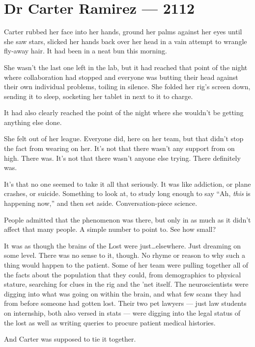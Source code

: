 \chapter*{Dr Carter Ramirez — 2112}

Carter rubbed her face into her hands, ground her palms against her eyes until she saw stars, slicked her hands back over her head in a vain attempt to wrangle fly-away hair. It had been in a neat bun this morning.

She wasn't the last one left in the lab, but it had reached that point of the night where collaboration had stopped and everyone was butting their head against their own individual problems, toiling in silence. She folded her rig's screen down, sending it to sleep, socketing her tablet in next to it to charge.

It had also clearly reached the point of the night where she wouldn't be getting anything else done.

She felt out of her league. Everyone did, here on her team, but that didn't stop the fact from wearing on her. It's not that there wasn't any support from on high. There was. It's not that there wasn't anyone else trying. There definitely was.

It's that no one seemed to take it all that seriously. It was like addiction, or plane crashes, or suicide. Something to look at, to study long enough to say ``Ah, \emph{this} is happening now,'' and then set aside. Conversation-piece science.

People admitted that the phenomenon was there, but only in as much as it didn't affect that many people. A simple number to point to. See how small?

It was as though the brains of the Lost were just\ldots{}elsewhere. Just dreaming on some level. There was no sense to it, though. No rhyme or reason to why such a thing would happen to the patient. Some of her team were pulling together all of the facts about the population that they could, from demographics to physical stature, searching for clues in the rig and the 'net itself. The neuroscientists were digging into what was going on within the brain, and what few scans they had from before someone had gotten lost. Their two pet lawyers --- just law students on internship, both also versed in stats --- were digging into the legal status of the lost as well as writing queries to procure patient medical histories.

And Carter was supposed to tie it together.

